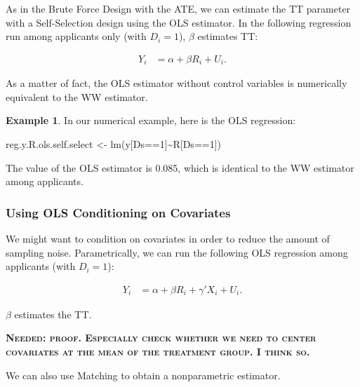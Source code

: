 \documentclass[
]{book}
\newenvironment{Shaded}{\begin{snugshade}}{\end{snugshade}}
\newcommand{\DecValTok}[1]{\textcolor[rgb]{0.00,0.00,0.81}{#1}}
\newcommand{\FunctionTok}[1]{\textcolor[rgb]{0.00,0.00,0.00}{#1}}
\newcommand{\NormalTok}[1]{#1}
\newcommand{\OtherTok}[1]{\textcolor[rgb]{0.56,0.35,0.01}{#1}}
\newcommand{\SpecialCharTok}[1]{\textcolor[rgb]{0.00,0.00,0.00}{#1}}
\theoremstyle{definition}
\theoremstyle{definition}
\newtheorem{example}{Example}[chapter]
\theoremstyle{definition}
\theoremstyle{definition}
\theoremstyle{remark}
\begin{document}
As in the Brute Force Design with the ATE, we can estimate the TT parameter with a Self-Selection design using the OLS estimator.
In the following regression run among applicants only (with \(D_i=1\)), \(\beta\) estimates TT:

\begin{align*}
    Y_i &  = \alpha +  \beta R_i + U_i.
    \end{align*}

As a matter of fact, the OLS estimator without control variables is numerically equivalent to the WW estimator.

\begin{example}
\protect\hypertarget{exm:unnamed-chunk-84}{}{\label{exm:unnamed-chunk-84} }In our numerical example, here is the OLS regression:
\end{example}

\begin{Shaded}
\begin{Highlighting}[]
\NormalTok{reg.y.R.ols.self.select }\OtherTok{\textless{}{-}} \FunctionTok{lm}\NormalTok{(y[Ds}\SpecialCharTok{==}\DecValTok{1}\NormalTok{]}\SpecialCharTok{\textasciitilde{}}\NormalTok{R[Ds}\SpecialCharTok{==}\DecValTok{1}\NormalTok{])}
\end{Highlighting}
\end{Shaded}

The value of the OLS estimator is 0.085, which is identical to the WW estimator among applicants.

\hypertarget{using-ols-conditioning-on-covariates-1}{%
\subsubsection{Using OLS Conditioning on Covariates}\label{using-ols-conditioning-on-covariates-1}}

We might want to condition on covariates in order to reduce the amount of sampling noise.
Parametrically, we can run the following OLS regression among applicants (with \(D_i=1\)):

\begin{align*}
    Y_i &  = \alpha +  \beta R_i + \gamma' X_i + U_i.
\end{align*}

\(\beta\) estimates the TT.

\textbf{\textsc{Needed: proof. Especially check whether we need to center covariates at the mean of the treatment group. I think so.}}

We can also use Matching to obtain a nonparametric estimator.
\end{document}
